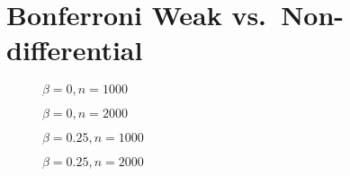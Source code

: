 \section{Bonferroni Weak vs.\ Non-differential}

\begin{figure}
  \centering
  
  \caption{$\beta = 0, n = 1000$}
\end{figure}

\begin{figure}
  \centering
  
  \caption{$\beta = 0, n = 2000$}
\end{figure}
\begin{figure}
  \centering
  
  \caption{$\beta = 0.25, n = 1000$}
\end{figure}

\begin{figure}
  \centering
  
  \caption{$\beta = 0.25, n = 2000$}
\end{figure}

